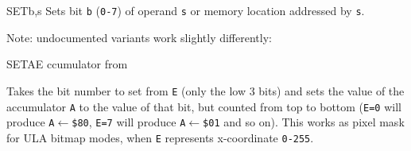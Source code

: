 \begin{basedescript}{
	\desclabelstyle{\multilinelabel}
	\desclabelwidth{3cm}}
\begin{DetailItem}{SET}{b,s}
		Sets bit {\tt b} ({\tt 0-7}) of operand {\tt s} or memory location addressed by {\tt s}.

		Note: undocumented variants work slightly differently:

		\begin{multicols}{2}

		\end{multicols}

		\begin{DetailEffects}
			\FlagsSETr
		\end{DetailEffects}

		\begin{DetailTiming}
			\DetailTime[r]{2}{8}
			\DetailTime[(HL)]{4}{15}
			\DetailTime[(IX+d)]{6}{23}
			\DetailTime[(IY+d)]{6}{23}
		\end{DetailTiming}

	\end{DetailItem}


	\begin{DetailItem}{SETAE}{\DetailItemZXN}
		{ ccumulator from \IH{E}}
		{\SymSETAE}

		Takes the bit number to set from {\tt E} (only the low 3 bits) and sets the value of the accumulator {\tt A} to the value of that bit, but counted from top to bottom ({\tt E=0} will produce {\tt A$\leftarrow$\$80}, {\tt E=7} will produce {\tt A$\leftarrow$\$01} and so on). This works as pixel mask for ULA bitmap modes, when {\tt E} represents x-coordinate {\tt 0-255}.

		\begin{DetailEffects}
			\FlagsSETAE
		\end{DetailEffects}
						
		\begin{DetailTiming}
			\DetailTime{2}{8}
		\end{DetailTiming}


\end{DetailItem}
\end{basedescript}
